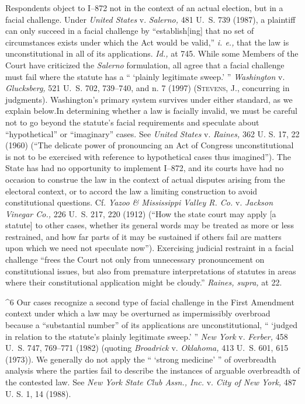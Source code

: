   Respondents object to I--872 not in the context of an actual
election, but in a facial challenge. Under \emph{United States} v.
\emph{Salerno,} 481 U.~S. 739 (1987), a plaintiff can only succeed in
a facial challenge by ``establish[ing] that no set of circumstances
exists under which the Act would be valid,'' \emph{i. e.,} that the law is
unconstitutional in all of its applications. \emph{Id.,} at 745. While
some Members of the Court have criticized the \emph{Salerno} formulation,
all agree that a facial challenge must fail where the statute has a ``
‘plainly legitimate sweep.' '' \emph{Washington} v. \emph{Glucksberg,}
521 U.~S. 702, 739--740, and n. 7 (1997) (\textsc{Stevens,} J., concurring
in judgments). Washington's primary system survives under either
standard, as we explain below.\footnotemark[6] In determining whether a law is
facially in\newpage valid, we must be careful not to go beyond the
statute's facial requirements and speculate about ``hypothetical''
or ``imaginary'' cases. See \emph{United States} v. \emph{Raines,} 362
U. S. 17, 22 (1960) (``The delicate power of pronouncing an Act
of Congress unconstitutional is not to be exercised with reference
to hypothetical cases thus imagined''). The State has had no
opportunity to implement I--872, and its courts have had no occasion
to construe the law in the context of actual disputes arising from the
electoral context, or to accord the law a limiting construction to avoid
constitutional questions. Cf. \emph{Yazoo \& Mississippi Valley R. Co.} v.
\emph{Jackson Vinegar Co.,} 226 U.~S. 217, 220 (1912) (``How the state
court may apply [a statute] to other cases, whether its general words
may be treated as more or less restrained, and how far parts of it may
be sustained if others fail are matters upon which we need not speculate
now''). Exercising judicial restraint in a facial challenge ``frees
the Court not only from unnecessary pronouncement on constitutional
issues, but also from premature interpretations of statutes in areas
where their constitutional application might be cloudy.'' \emph{Raines,
supra,} at 22.

^6 Our cases recognize a second type of facial challenge in the First
Amendment context under which a law may be overturned as impermissibly
overbroad because a ``substantial number'' of its applications are
unconstitutional, `` ‘judged in relation to the statute's plainly
legitimate sweep.' '' \emph{New York} v. \emph{Ferber,} 458 U.~S. 747,
769--771 (1982) (quoting \emph{Broadrick} v. \emph{Oklahoma,} 413 U.~S. 601,
615 (1973)). We generally do not apply the `` ‘strong medicine'
'' of overbreadth analysis where the parties fail to describe the
instances of arguable overbreadth of the contested \newpage  law. See
\emph{New York State Club Assn., Inc.} v. \emph{City of New York,} 487 U. S.
1, 14 (1988).

